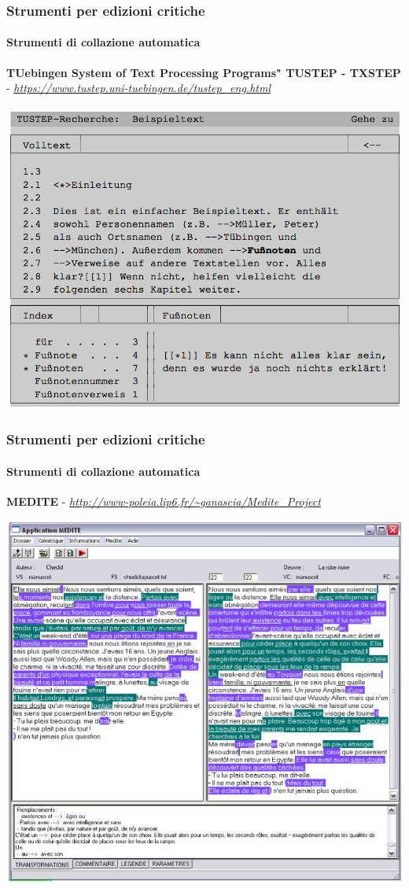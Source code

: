 \begin{frame}
    \frametitle{Strumenti per edizioni critiche}
    \framesubtitle{Strumenti di collazione automatica}
	\addtocounter{nframe}{1}
    \begin{center}
        \textbf{TUebingen System of Text Processing Programs" TUSTEP - TXSTEP} - \textit{\url{https://www.tustep.uni-tuebingen.de/tustep_eng.html}}
    \end{center}
    \begin{center}
        \includegraphics[width=.65\textwidth]{imgs/tustep.png}
	\end{center}
\end{frame}

\begin{frame}
    \frametitle{Strumenti per edizioni critiche}
    \framesubtitle{Strumenti di collazione automatica}
	\addtocounter{nframe}{1}
    \begin{center}
        \textbf{MEDITE} - \textit{\url{http://www-poleia.lip6.fr/~ganascia/Medite\_Project}}
    \end{center}
    \begin{center}
        \includegraphics[width=.65\textwidth]{imgs/medite.png}
	\end{center}
\end{frame}


